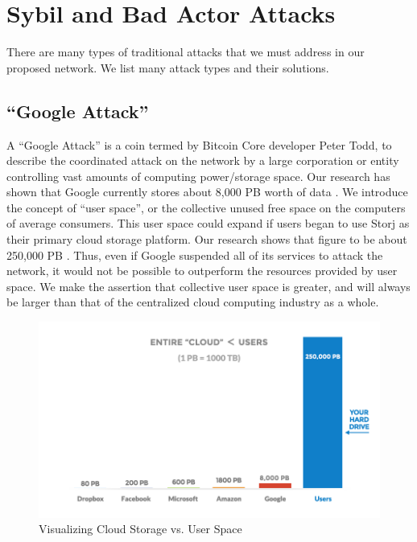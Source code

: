 \documentclass[a4paper,10pt]{article}
\begin{document}
\section{Sybil and Bad Actor Attacks}
There are many types of traditional attacks that we must address in our proposed network. We list many attack types and their solutions. 
\subsection{``Google Attack''}
A “Google Attack” is a coin termed by Bitcoin Core developer Peter Todd, to describe the coordinated attack on the network by a large corporation or entity controlling vast amounts of computing power/storage space. Our research has shown that Google currently stores about 8,000 PB worth of data \cite{15}. We introduce the concept of “user space”, or the collective unused free space on the computers of average consumers. This user space could expand if users began to use Storj as their primary cloud storage platform. Our research shows that figure to be about 250,000 PB \cite{15}. Thus, even if Google suspended all of its services to attack the network, it would not be possible to outperform the resources provided by user space. We make the assertion that collective user space is greater, and will always be larger than that of the centralized cloud computing industry as a whole.

\begin{figure}[hbt]
\centering
\includegraphics[width=\linewidth]{8}
\caption{Visualizing Cloud Storage vs. User Space }
\end{figure}
\end{document}
